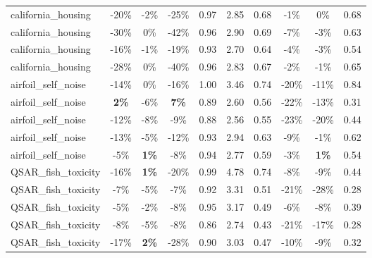 \begin{table}[!htbp]
\begin{small}
\begin{sc}
{\begin{tabular}{lccccccccc}
california\_housing & -20\% & -2\% & -25\% & 0.97 & 2.85 & 0.68 & -1\% & 0\% & 0.68 \\
california\_housing & -30\% & 0\% & -42\% & 0.96 & 2.90 & 0.69 & -7\% & -3\% & 0.63 \\
california\_housing & -16\% & -1\% & -19\% & 0.93 & 2.70 & 0.64 & -4\% & -3\% & 0.54 \\
california\_housing & -28\% & 0\% & -40\% & 0.96 & 2.83 & 0.67 & -2\% & -1\% & 0.65 \\
airfoil\_self\_noise & -14\% & 0\% & -16\% & 1.00 & 3.46 & 0.74 & -20\% & -11\% & 0.84 \\
airfoil\_self\_noise & \textbf{2\%} & -6\% & \textbf{7\%} & 0.89 & 2.60 & 0.56 & -22\% & -13\% & 0.31 \\
airfoil\_self\_noise & -12\% & -8\% & -9\% & 0.88 & 2.56 & 0.55 & -23\% & -20\% & 0.44 \\
airfoil\_self\_noise & -13\% & -5\% & -12\% & 0.93 & 2.94 & 0.63 & -9\% & -1\% & 0.62 \\
airfoil\_self\_noise & -5\% & \textbf{1\%} & -8\% & 0.94 & 2.77 & 0.59 & -3\% & \textbf{1\%} & 0.54 \\
QSAR\_fish\_toxicity & -16\% & \textbf{1\%} & -20\% & 0.99 & 4.78 & 0.74 & -8\% & -9\% & 0.44 \\
QSAR\_fish\_toxicity & -7\% & -5\% & -7\% & 0.92 & 3.31 & 0.51 & -21\% & -28\% & 0.28 \\
QSAR\_fish\_toxicity & -5\% & -2\% & -8\% & 0.95 & 3.17 & 0.49 & -6\% & -8\% & 0.39 \\
QSAR\_fish\_toxicity & -8\% & -5\% & -8\% & 0.86 & 2.74 & 0.43 & -21\% & -17\% & 0.28 \\
QSAR\_fish\_toxicity & -17\% & \textbf{2\%} & -28\% & 0.90 & 3.03 & 0.47 & -10\% & -9\% & 0.32 \\
\bottomrule
\end{tabular}
}
\end{sc}
\end{small}
\end{table}
